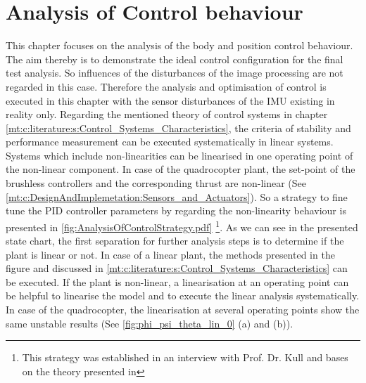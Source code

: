 \section{Analysis of Control behaviour}
\label{mt:c:expResults:AnalysisofControlbehaviour}
This chapter focuses on the analysis of the body and position control behaviour. The aim thereby is to demonstrate the ideal control configuration for the final test analysis. So influences of the disturbances of the image processing are not regarded in this case. Therefore the analysis and optimisation of control is executed in this chapter with the sensor disturbances of the \gls{IMU} existing in reality only.
Regarding the mentioned theory of control systems in chapter \ref{mt:c:literature:s:Control_Systems_Characteristics}, the criteria of stability and performance measurement can be executed systematically in linear systems. Systems which include non-linearities can be linearised in one operating point of the non-linear component. In case of the quadrocopter plant, the set-point of the brushless controllers and the corresponding thrust are non-linear (See \ref{mt:c:DesignAndImplemetation:Sensors_and_Actuators}). So a strategy to fine tune the \gls{PID} controller parameters by regarding the non-linearity behaviour is presented in \ref{fig:AnalysisOfControlStrategy.pdf}
\footnote{This strategy was established in an interview with Prof. Dr. Kull and bases on the theory presented in }.
As we can see in the presented state chart, the first separation for further analysis steps is to determine if the plant is linear or not. In case of a linear plant, the methods presented in the figure and discussed in \ref{mt:c:literature:s:Control_Systems_Characteristics} can be executed. If the plant is non-linear, a linearisation at an operating point can be helpful to linearise the model and to execute the linear analysis systematically. In case of the quadrocopter, the linearisation at several operating points show the same unstable results 
(See \ref{fig:phi_psi_theta_lin_0} (a) and (b)). 

